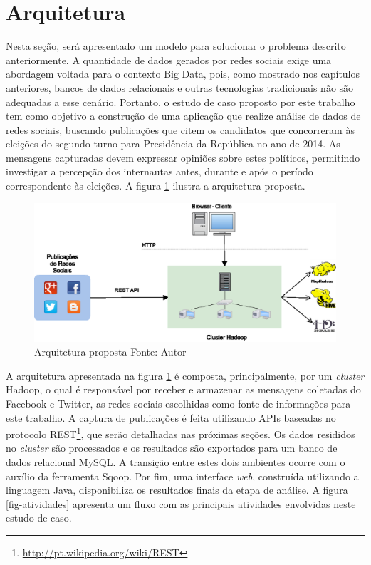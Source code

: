 \section{Arquitetura}

Nesta seção, será apresentado um modelo para solucionar o problema descrito anteriormente. A quantidade de dados gerados por redes sociais exige uma abordagem voltada para o contexto Big Data, pois, como mostrado nos capítulos anteriores, bancos de dados relacionais e outras tecnologias tradicionais não são adequadas a esse cenário. Portanto, o estudo de caso proposto por este trabalho tem como objetivo a construção de uma aplicação que realize análise de dados de redes sociais, buscando publicações que citem os candidatos que concorreram às eleições do segundo turno para Presidência da República no ano de 2014. As mensagens capturadas devem expressar opiniões sobre estes políticos, permitindo investigar a percepção dos internautas antes, durante e após o período correspondente às eleições. A figura \ref{fig-arq-projeto} ilustra a arquitetura proposta.

\begin{figure}[ht!]
	\centering
	\includegraphics[keepaspectratio=true,scale=0.35]
	  {figuras/arquitetura.eps}
	\caption[Arquitetura proposta]{Arquitetura proposta
	\protect\linebreak Fonte: Autor}
	\label{fig-arq-projeto}
\end{figure}
\FloatBarrier

A arquitetura apresentada na figura \ref{fig-arq-projeto} é composta, principalmente, por um \textit{cluster} Hadoop, o qual é responsável por receber e armazenar as mensagens coletadas do Facebook e Twitter, as redes sociais escolhidas como fonte de informações para este trabalho. A captura de publicações é feita utilizando APIs baseadas no protocolo REST\footnote{\url{http://pt.wikipedia.org/wiki/REST}}, que serão detalhadas nas próximas seções. Os dados resididos no \textit{cluster} são processados e os resultados são exportados para um banco de dados relacional MySQL. A transição entre estes dois ambientes ocorre com o auxílio da ferramenta Sqoop. Por fim, uma interface \textit{web}, construída utilizando a linguagem Java, disponibiliza os resultados finais da etapa de análise. A figura \ref{fig-atividades} apresenta um fluxo com as principais atividades envolvidas neste estudo de caso.

